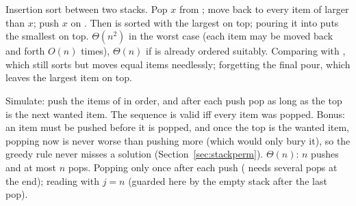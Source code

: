 \idea Insertion sort between two stacks. Pop $x$ from ; move back to  every
item of  larger than $x$; push $x$ on . Then  is sorted with the
largest on top; pouring it into  puts the smallest on top.
\complexity $\Theta(n^2)$ in the worst case (each item may be moved back and forth $O(n)$
times), $\Theta(n)$ if  is already ordered suitably.
\mistakes Comparing with \cc{>=}, which still sorts but moves equal items needlessly;
forgetting the final pour, which leaves the largest item on top.

\idea Simulate: push the items of  in order, and after each push pop as long as
the top is the next wanted item. The sequence is valid iff every item was popped. Bonus:
an item must be pushed before it is popped, and once the top is the wanted item, popping
now is never worse than pushing more (which would only bury it), so the greedy rule
never misses a solution (Section~\ref{sec:stackperm}).
\complexity $\Theta(n)$: $n$ pushes and at most $n$ pops.
\mistakes Popping only once after each push ( needs several pops at the
end); reading  with $j=n$ (guarded here by the empty stack after the last
pop).
